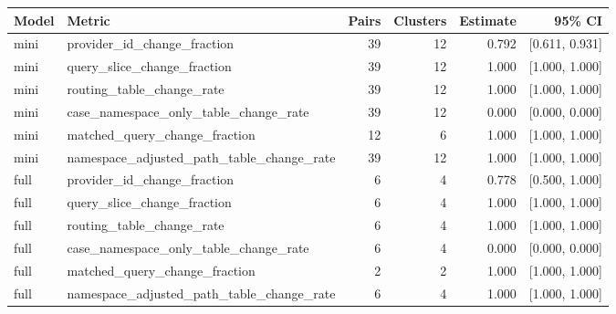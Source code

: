 \begin{tabular}{llrrrr}
Model & Metric & Pairs & Clusters & Estimate & 95\% CI \\
\hline
mini & provider\_id\_change\_fraction & 39 & 12 & 0.792 & [0.611, 0.931] \\
mini & query\_slice\_change\_fraction & 39 & 12 & 1.000 & [1.000, 1.000] \\
mini & routing\_table\_change\_rate & 39 & 12 & 1.000 & [1.000, 1.000] \\
mini & case\_namespace\_only\_table\_change\_rate & 39 & 12 & 0.000 & [0.000, 0.000] \\
mini & matched\_query\_change\_fraction & 12 & 6 & 1.000 & [1.000, 1.000] \\
mini & namespace\_adjusted\_path\_table\_change\_rate & 39 & 12 & 1.000 & [1.000, 1.000] \\
full & provider\_id\_change\_fraction & 6 & 4 & 0.778 & [0.500, 1.000] \\
full & query\_slice\_change\_fraction & 6 & 4 & 1.000 & [1.000, 1.000] \\
full & routing\_table\_change\_rate & 6 & 4 & 1.000 & [1.000, 1.000] \\
full & case\_namespace\_only\_table\_change\_rate & 6 & 4 & 0.000 & [0.000, 0.000] \\
full & matched\_query\_change\_fraction & 2 & 2 & 1.000 & [1.000, 1.000] \\
full & namespace\_adjusted\_path\_table\_change\_rate & 6 & 4 & 1.000 & [1.000, 1.000] \\
\end{tabular}
